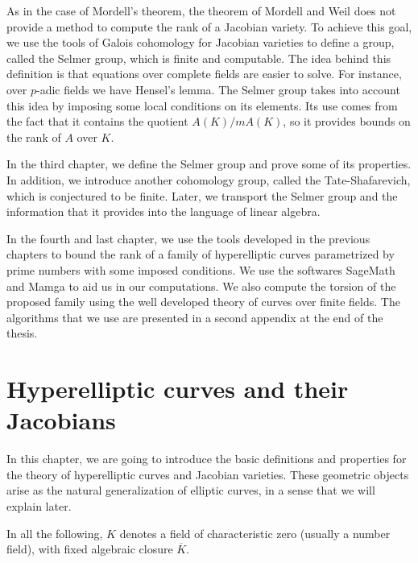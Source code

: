 \documentclass[a4paper, 12pt]{amsart}
\theoremstyle{definition}
\theoremstyle{plain}
\theoremstyle{plain}
\theoremstyle{plain}
\theoremstyle{plain}
\theoremstyle{remark}
\theoremstyle{remark}
\theoremstyle{plain}
\begin{document}
	As in the case of Mordell's theorem, the theorem of Mordell and Weil does not provide a method to compute the rank of a Jacobian variety. To achieve this goal, we use the tools of Galois cohomology for Jacobian varieties to define a group, called the Selmer group, which is finite and computable. The idea behind this definition is that equations over complete fields are easier to solve. For instance, over $p$-adic fields we have Hensel's lemma. The Selmer group takes into account this idea by imposing some local conditions on its elements. Its use comes from the fact that it contains the quotient $A(K)/mA(K)$, so it provides bounds on the rank of $A$ over $K$.
	
	In the third chapter, we define the Selmer group and prove some of its properties. In addition, we introduce another cohomology group, called the Tate-Shafarevich, which is conjectured to be finite. Later, we transport the Selmer group and the information that it provides into the language of linear algebra.
	
	In the fourth and last chapter, we use the tools developed in the previous chapters to
	bound the rank of a family of hyperelliptic curves parametrized by prime numbers with
	some imposed conditions. We use the softwares SageMath and Mamga to aid us in our computations. We also compute the torsion of the proposed family using the well developed theory of curves over finite fields. The algorithms that we use are presented in a second appendix at the end of the thesis.

	
	
	
	
	
	
	
	
	
	
	
	\newpage
	\thispagestyle{plain}
	\section{Hyperelliptic curves and their Jacobians}
	
	In this chapter, we are going to introduce the basic definitions and properties for the theory of hyperelliptic curves and Jacobian varieties. These geometric objects arise as the natural generalization of elliptic curves, in a sense that we will explain later.
	
	In all the following, $K$ denotes a field of characteristic zero (usually a number field), with fixed algebraic closure $\overline{K}$.
	
\end{document}
